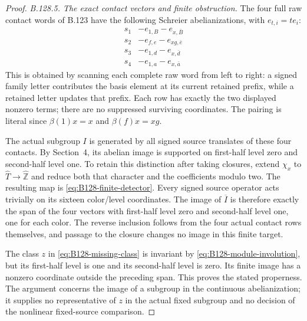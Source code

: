 \begin{proof}
\emph{B.128.5. The exact contact vectors and finite obstruction.}
The four full raw contact words of B.123 have the following
Schreier abelianizations, with $e_{t,i}=t e_i$:
\begin{equation}\label{eq:B128-contact-vectors}
\begin{array}{c|c}
 s_1&-e_{1,B}-e_{x,\bar B}\\
 s_2&-e_{f,e}-e_{xg,\bar e}\\
 s_3&-e_{1,d}-e_{x,\bar d}\\
 s_4&-e_{1,a}-e_{x,\bar a}
\end{array}
\end{equation}
This is obtained by scanning each complete raw word from left to
right: a signed family letter contributes the basis element at
its current retained prefix, while a retained letter updates that
prefix. Each row has exactly the two displayed nonzero terms;
there are no suppressed surviving coordinates. The pairing is
literal since $\beta(1)x=x$ and $\beta(f)x=xg$.

The actual subgroup $I$ is generated by all signed source
translates of these four contacts. By Section~4, its abelian image
is supported on first-half level zero and second-half level one.
To retain this distinction after taking closures, extend
$\chi_x$ to $\widehat T\to\widehat{\mathbb Z}$ and reduce
both that character and the coefficients modulo two. The resulting
map is \eqref{eq:B128-finite-detector}. Every signed source
operator acts trivially on its sixteen color/level coordinates.
The image of $\overline I$ is therefore exactly the span of the
four vectors with first-half level zero and second-half level one,
one for each color. The reverse inclusion follows from the four
actual contact rows themselves, and passage to the closure changes
no image in this finite target.

The class $z$ in \eqref{eq:B128-missing-class} is invariant by
\eqref{eq:B128-module-involution}, but its first-half level is one
and its second-half level is zero. Its finite image has a nonzero
coordinate outside the preceding span. This proves the stated
properness. The argument concerns the image of a subgroup in the
continuous abelianization; it supplies no representative of $z$
in the actual fixed subgroup and no decision of the nonlinear
fixed-source comparison.
\end{proof}

